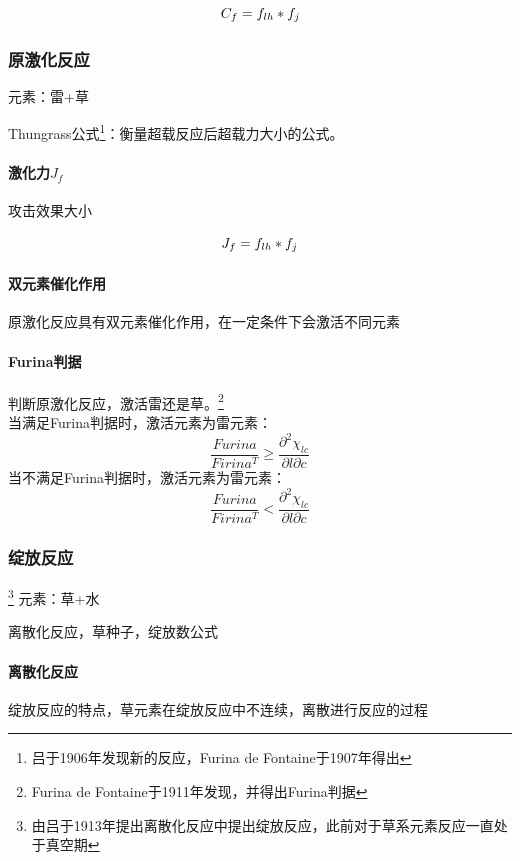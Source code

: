 \documentclass[12pt,a4paper]{article}%
\begin{document}
\begin{equation}
C_f=f_{lh}*f_j \notag
\end{equation}
\subsubsection{原激化反应}
元素：雷+草\\
\par Thungrass公式\footnote[7]{吕于1906年发现新的反应，Furina de Fontaine于1907年得出}：衡量超载反应后超载力大小的公式。
\paragraph{激化力$J_f$} 攻击效果大小

\begin{equation}
J_f=f_{lh}*f_j \notag
\end{equation}


\paragraph{双元素催化作用} 原激化反应具有双元素催化作用，在一定条件下会激活不同元素
\paragraph{Furina判据}判断原激化反应，激活雷还是草。\footnote[8]{Furina de Fontaine于1911年发现，并得出Furina判据}\\
当满足Furina判据时，激活元素为雷元素：
\begin{equation}
	\frac{Furina}{Firina^{T}} \ge  \frac{\partial^2 \chi _{lc}}{\partial l\partial c}
	\end{equation}
当不满足Furina判据时，激活元素为雷元素：
\begin{equation}
	\frac{Furina}{Firina^{T}} < \frac{\partial^2 \chi _{lc}}{\partial l\partial c}
	\end{equation}
\subsubsection{绽放反应}\footnote[9]{由吕于1913年提出离散化反应中提出绽放反应，此前对于草系元素反应一直处于真空期}
元素：草+水\\
\par 离散化反应，草种子，绽放数公式
\paragraph{离散化反应} 绽放反应的特点，草元素在绽放反应中不连续，离散进行反应的过程
\end{document}
